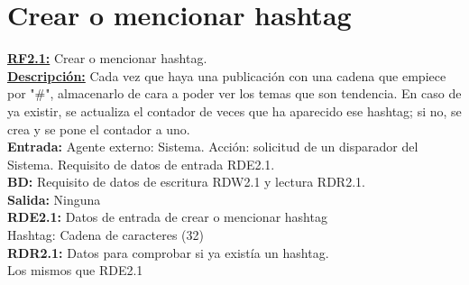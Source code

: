 



\section{Crear o mencionar hashtag}
\textbf{\textcolor{rojo}{\underline{RF2.1:}}} Crear o mencionar hashtag. \\[6pt]

\textbf{\textcolor{rojo}{\underline{Descripción:}}} Cada vez que haya una publicación con una cadena que empiece por "\#", almacenarlo de cara a poder ver los temas que son tendencia. En caso de ya existir, se actualiza el contador de veces que ha aparecido ese hashtag; si no, se crea y se pone el contador a uno.
 \\[6pt]

\textbf{\textcolor{rojo}{Entrada:}} Agente externo: Sistema. Acción: solicitud de un disparador del Sistema. 
Requisito de datos de entrada \textcolor{azul}{RDE2.1}. \\[6pt]

\textbf{\textcolor{rojo}{BD:}} Requisito de datos de escritura \textcolor{azul}{RDW2.1} y lectura \textcolor{azul}{RDR2.1.} \\[6pt]

\textbf{\textcolor{rojo}{Salida:}} Ninguna \\[6pt]

\textcolor{azul}{\textbf{RDE2.1:}} Datos de entrada de crear o mencionar hashtag \\
\hspace*{1cm} Hashtag: Cadena de caracteres (32) \\[12pt]

\textcolor{azul}{\textbf{RDR2.1:}} Datos para comprobar si ya existía un hashtag. \\
\hspace*{1cm} Los mismos que RDE2.1\\

